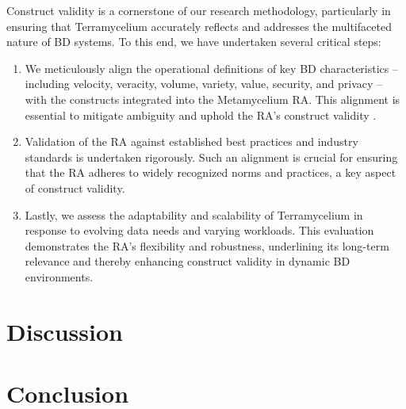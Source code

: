 \documentclass[preprint,12pt]{elsarticle}
\begin{document}
Construct validity is a cornerstone of our research methodology, particularly in ensuring that Terramycelium accurately reflects and addresses the multifaceted nature of BD systems. To this end, we have undertaken several critical steps:

\begin{enumerate}
    \item We meticulously align the operational definitions of key BD characteristics -- including velocity, veracity, volume, variety, value, security, and privacy -- with the constructs integrated into the Metamycelium RA. This alignment is essential to mitigate ambiguity and uphold the RA's construct validity \cite{rad2017big}.
    
    
    \item Validation of the RA against established best practices and industry standards is undertaken rigorously. Such an alignment is crucial for ensuring that the RA adheres to widely recognized norms and practices, a key aspect of construct validity.
    
    \item Lastly, we assess the adaptability and scalability of Terramycelium in response to evolving data needs and varying workloads. This evaluation demonstrates the RA's flexibility and robustness, underlining its long-term relevance and thereby enhancing construct validity in dynamic BD environments.
\end{enumerate}



\section{Discussion}
\label{sec:discussion}


\section{Conclusion}
\label{sec:conclusion}





\appendix






\end{document}
